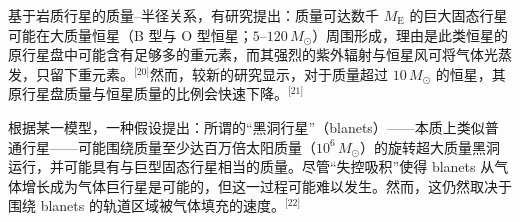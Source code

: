 基于岩质行星的质量–半径关系，有研究提出：质量可达数千 \(M_{\mathrm{E}}\) 的巨大固态行星可能在大质量恒星（B 型与 O 型恒星；\(5\text{--}120\,M_{\odot}\)）周围形成，理由是此类恒星的原行星盘中可能含有足够多的重元素，而其强烈的紫外辐射与恒星风可将气体光蒸发，只留下重元素。\(^\text{[20]}\)然而，较新的研究显示，对于质量超过 \(10\,M_{\odot}\) 的恒星，其原行星盘质量与恒星质量的比例会快速下降。\(^\text{[21]}\)

根据某一模型，一种假设提出：所谓的“黑洞行星”（blanets）——本质上类似普通行星——可能围绕质量至少达百万倍太阳质量（\(10^{6}\,M_{\odot}\)）的旋转超大质量黑洞运行，并可能具有与巨型固态行星相当的质量。尽管“失控吸积”使得 blanets 从气体增长成为气体巨行星是可能的，但这一过程可能难以发生。然而，这仍然取决于围绕 blanets 的轨道区域被气体填充的速度。\(^\text{[22]}\)

